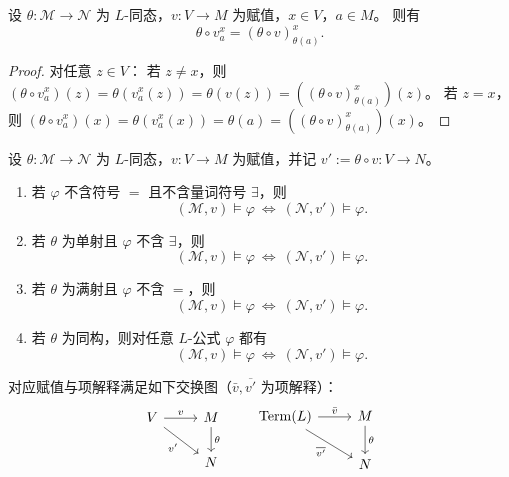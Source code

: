 \documentclass[lang=cn,a4paper,newtx,section]{elegantbook}
\begin{document}
 \begin{lemma}
 设 $\theta:\mathcal M\to\mathcal N$ 为 $L$-同态，$v:V\to M$ 为赋值，$x\in V$，$a\in M$。
 则有
 \[
   \theta\circ v_a^{x}=(\theta\circ v)_{\theta(a)}^{x}.
 \]
 \end{lemma}

 \begin{proof}
 对任意 $z\in V$：
 若 $z\neq x$，则 $(\theta\circ v_a^{x})(z)=\theta(v_a^{x}(z))=\theta(v(z))=((\theta\circ v)_{\theta(a)}^{x})(z)$。
 若 $z=x$，则 $(\theta\circ v_a^{x})(x)=\theta(v_a^{x}(x))=\theta(a)=((\theta\circ v)_{\theta(a)}^{x})(x)$。
 \end{proof}

 \begin{theorem}[同态与满足关系]
 设 $\theta:\mathcal M\to\mathcal N$ 为 $L$-同态，$v:V\to M$ 为赋值，并记 $v':=\theta\circ v:V\to N$。
 \begin{enumerate}
   \item 若 $\varphi$ 不含符号 $=$ 且不含量词符号 $\exists$，则
   \[
     (\mathcal M,v)\models\varphi\ \Longleftrightarrow\ (\mathcal N,v')\models\varphi.
   \]
   \item 若 $\theta$ 为单射且 $\varphi$ 不含 $\exists$，则
   \[
     (\mathcal M,v)\models\varphi\ \Longleftrightarrow\ (\mathcal N,v')\models\varphi.
   \]
   \item 若 $\theta$ 为满射且 $\varphi$ 不含 $=$，则
   \[
     (\mathcal M,v)\models\varphi\ \Longleftrightarrow\ (\mathcal N,v')\models\varphi.
   \]
   \item 若 $\theta$ 为同构，则对任意 $L$-公式 $\varphi$ 都有
   \[
     (\mathcal M,v)\models\varphi\ \Longleftrightarrow\ (\mathcal N,v')\models\varphi.
   \]
 \end{enumerate}
 \end{theorem}

 \begin{remark}
 对应赋值与项解释满足如下交换图（$\bar v,\overline{v'}$ 为项解释）：
 \[
 \begin{tikzcd}
 V \arrow[r, "v"] \arrow[dr, "v'"'] & M \arrow[d, "\theta"] \\
 & N
 \end{tikzcd}
 \qquad
 \begin{tikzcd}
 \mathrm{Term}(L) \arrow[r, "\bar v"] \arrow[dr, "\overline{v'}"'] & M \arrow[d, "\theta"] \\
 & N
 \end{tikzcd}
 \]
 \end{remark}
\end{document}
